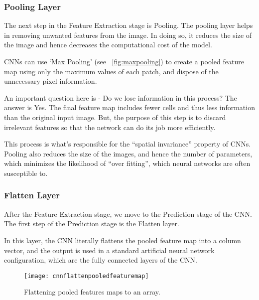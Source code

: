 	\subsubsection{Pooling Layer}
	\begin{bulletedlist}
		\item The next step in the Feature Extraction stage is Pooling.  The pooling layer helps in removing unwanted features from the image.  In doing so, it reduces the size of the image and hence decreases the computational cost of the model.
		\item CNNs can use `Max Pooling' (see \figurename~\ref{fig:maxpooling}) to create a pooled feature map using only the maximum values of each patch, and dispose of the unnecessary pixel information.
		\item An important question here is - Do we lose information in this process?  The answer is Yes.  The final feature map includes fewer cells and thus less information than the original input image.  But, the purpose of this step is to discard irrelevant features so that the network can do its job more efficiently.
		\item This process is what's responsible for the ``spatial invariance'' property of CNNs.  Pooling also reduces the size of the images, and hence the number of parameters, which minimizes the likelihood of ``over fitting'', which neural networks are often susceptible to.
	\end{bulletedlist}

	\subsubsection{Flatten Layer}
	\begin{bulletedlist}
		\item After the Feature Extraction stage, we move to the Prediction stage of the CNN.  The first step of the Prediction stage is the Flatten layer.
		\item In this layer, the CNN literally flattens the pooled feature map into a column vector, and the output is used in a standard artificial neural network configuration, which are the fully connected layers of the CNN.
	\end{bulletedlist}

	\begin{figure}[tbh]
		\centering
		\texttt{[image: cnnflattenpooledfeaturemap]}
		\caption[Flattening pooled features maps to an array]{Flattening pooled features maps to an array.}
		\label{fig:cnnflattenpooledfeaturemap}
	\end{figure}

